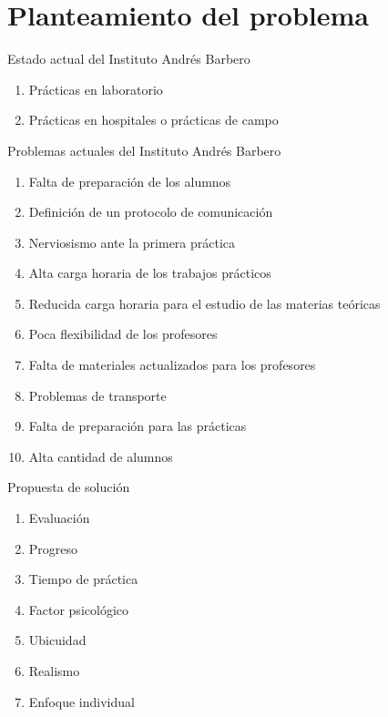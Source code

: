 \section{Planteamiento del problema}
\setcounter{sectiontotal}{8}

\begin{frame}{Estado actual del Instituto Andrés Barbero}


    
	\begin{enumerate}[<+->]
	\item Prácticas en laboratorio
	\item Prácticas en hospitales o prácticas de campo
	\end{enumerate}
\end{frame}

\begin{frame}{Problemas actuales del Instituto Andrés Barbero}
	\begin{enumerate}[<+->]
	\item Falta de preparación de los alumnos
	\item Definición de un protocolo de comunicación
	\item Nerviosismo ante la primera práctica
	\item Alta carga horaria de los trabajos prácticos
	\item Reducida carga horaria para el estudio de las materias teóricas
	\item Poca flexibilidad de los profesores
	\item Falta de materiales actualizados para los profesores
	\item Problemas de transporte
	\item Falta de preparación para las prácticas
	\item Alta cantidad de alumnos
	\end{enumerate}
\end{frame}

\begin{frame}{Propuesta de solución}
	\begin{enumerate}[<+->]
	\item Evaluación
	\item Progreso
	\item Tiempo de práctica
	\item Factor psicológico
	\item Ubicuidad
	\item Realismo
	\item Enfoque individual
	\end{enumerate}
\end{frame}

